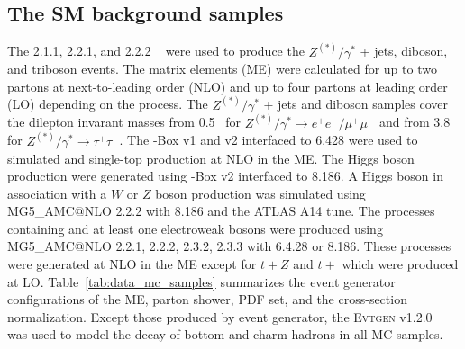 \subsection{The SM background samples}
\label{subsec:data_sm_bkg_samples}
The {\SHERPA} 2.1.1, 2.2.1, and 2.2.2 ~\cite{Gleisberg:2008ta} were used to produce the $Z^{(*)}/\gamma^{*}$ + jets, diboson, and triboson events.
The matrix elements (ME) were calculated for up to two partons at next-to-leading order (NLO) and up to four partons at leading order (LO) depending on the process.
The $Z^{(*)}/\gamma^{*}$ + jets and diboson samples cover the dilepton invarant masses from 0.5~{\GeV} for $Z^{(*)}/\gamma^{*} \to e^{+}e^{-}/\mu^{+}\mu^{-}$ and from 3.8~{\GeV} for $Z^{(*)}/\gamma^{*} \to \tau^{+}\tau^{-}$.
The {\POWHEG}-Box v1 and v2 interfaced to {\PYTHIA} 6.428 were used to simulated \ttbar and single-top production at NLO in the ME.
The Higgs boson production were generated using {\POWHEG}-Box v2 interfaced to {\PYTHIA} 8.186.
A Higgs boson in association with a $W$ or $Z$ boson production was simulated using MG5\_{\scriptsize A}MC@NLO 2.2.2 with {\PYTHIA} 8.186 and the ATLAS A14 tune.
The processes containing \ttbar and at least one electroweak bosons were produced using MG5\_{\scriptsize A}MC@NLO 2.2.1, 2.2.2, 2.3.2, 2.3.3 with {\PYTHIA} 6.4.28 or 8.186.
These processes were generated at NLO in the ME except for $t + Z$ and $t +$ \ttbar which were produced at LO.
Table~\ref{tab:data_mc_samples} summarizes the event generator configurations of the ME, parton shower, PDF set, and the cross-section normalization.
Except those produced by {\SHERPA} event generator, the \textsc{Evtgen}\xspace v1.2.0~\cite{Lange:2001uf} was used to model the decay of bottom and charm hadrons in all MC samples.

